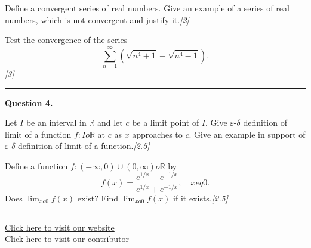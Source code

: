 \documentclass[11pt,a4paper]{article}
\newcommand{\pts}[1]{\hfill   \textit{[#1]}}
\begin{document}
\begin{parts}
  \item Define a convergent series of real numbers. Give an example of a series of real numbers, which is not convergent and justify it.\pts{2}
  \item Test the convergence of the series
  \[
    \sum_{n=1}^{\infty} \left( \sqrt{n^4 + 1} - \sqrt{n^4 - 1} \right).
  \]\pts{3}
\end{parts}

\medskip\rule{\linewidth}{0.2pt}\medskip




\noindent   \textbf{Question 4.}

\begin{parts}
  \item Let $I$ be an interval in $\mathbb{R}$ and let $c$ be a limit point of $I$. Give $\varepsilon$-$\delta$ definition of limit of a function $f : I  o \mathbb{R}$ at $c$ as $x$ approaches to $c$. Give an example in support of $\varepsilon$-$\delta$ definition of limit of a function.\pts{2.5}
  \item Define a function $f : (-\infty, 0) \cup (0, \infty)  o \mathbb{R}$ by
  \[
    f(x) = \frac{e^{1/x} - e^{-1/x}}{e^{1/x} + e^{-1/x}}, \quad x 
eq 0.
  \]
  Does $\lim_{x  o 0} f(x)$ exist? Find $\lim_{x  o 0} f(x)$ if it exists.\pts{2.5}
\end{parts}

\vfill
\rule{\linewidth}{0.4pt}

\begin{center}\small
\href{https://bhu-exam.vercel.app/}{Click here to visit our website}\\[4pt]
\href{https://me-aryan.vercel.app/}{Click here to visit our contributor}
\end{center}
\end{document}

